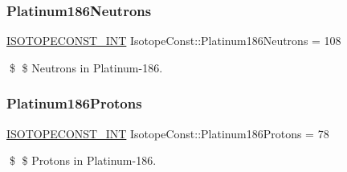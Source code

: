 \subsubsection{\texorpdfstring{Platinum186\+Neutrons}{Platinum186Neutrons}}
{\footnotesize\ttfamily \mbox{\hyperlink{group___isotope_const-_macros_ga5f18360b3e99483a35c32d789e62621c}{I\+S\+O\+T\+O\+P\+E\+C\+O\+N\+S\+T\+\_\+\+I\+NT}} Isotope\+Const\+::\+Platinum186\+Neutrons = 108}

\$ \$ Neutrons in Platinum-\/186. \mbox{\label{group___isotope_const-_platinum-_pt186_ga98bd07ce6eaf301d20f062ba8fc770b6}} 
\subsubsection{\texorpdfstring{Platinum186\+Protons}{Platinum186Protons}}
{\footnotesize\ttfamily \mbox{\hyperlink{group___isotope_const-_macros_ga5f18360b3e99483a35c32d789e62621c}{I\+S\+O\+T\+O\+P\+E\+C\+O\+N\+S\+T\+\_\+\+I\+NT}} Isotope\+Const\+::\+Platinum186\+Protons = 78}

\$ \$ Protons in Platinum-\/186. 